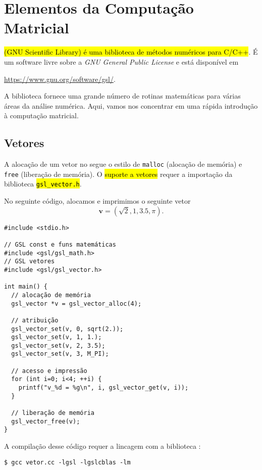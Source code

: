 \documentclass[12pt]{article}
\begin{document}
\section{Elementos da Computação Matricial}\label{sec_mat}

\hl{{\gsl} (GNU Scientific Library) é uma biblioteca de métodos numéricos para C/C++}. É um software livre sobre a \textit{GNU General Public License} e está disponível em
\begin{center}
  \url{https://www.gnu.org/software/gsl/}.
\end{center}

A biblioteca fornece uma grande número de rotinas matemáticas para várias áreas da análise numérica. Aqui, vamos nos concentrar em uma rápida introdução à computação matricial.

\subsection{Vetores}\label{sec_mat_subsec_vet}

A alocação de um vetor no {\gsl} segue o estilo de \lstinline+malloc+ (alocação de memória) e \lstinline+free+ (liberação de memória). O \hl{suporte a vetores} requer a importação da biblioteca \hl{\texttt{gsl\_vector.h}}.

\begin{ex}
  No seguinte código, alocamos e imprimimos o seguinte vetor
  \begin{equation}
    \pmb{v} = (\sqrt{2}, 1, 3.5, \pi).
  \end{equation}

\begin{lstlisting}[caption=vector.cc]
#include <stdio.h>

// GSL const e funs matemáticas
#include <gsl/gsl_math.h>
// GSL vetores
#include <gsl/gsl_vector.h>

int main() {
  // alocação de memória
  gsl_vector *v = gsl_vector_alloc(4);

  // atribuição
  gsl_vector_set(v, 0, sqrt(2.));
  gsl_vector_set(v, 1, 1.);
  gsl_vector_set(v, 2, 3.5);
  gsl_vector_set(v, 3, M_PI);

  // acesso e impressão
  for (int i=0; i<4; ++i) {
    printf("v_%d = %g\n", i, gsl_vector_get(v, i));
  }
  
  // liberação de memória
  gsl_vector_free(v);
}
\end{lstlisting}

  A compilação desse código requer a lincagem com a biblioteca {\gsl}:
\begin{lstlisting}
$ gcc vetor.cc -lgsl -lgslcblas -lm
\end{lstlisting}
\end{ex}
\end{document}
